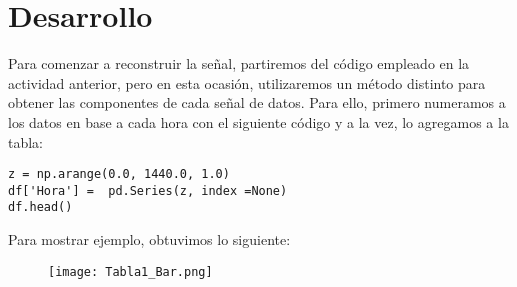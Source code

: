 \documentclass{article}
\begin{document}
\section*{\Large Desarrollo}
Para comenzar a reconstruir la señal, partiremos del código empleado en la actividad anterior, pero en esta ocasión, utilizaremos un método distinto para obtener las componentes de cada señal de datos. Para ello, primero numeramos a los datos en base a cada hora con el siguiente código y a la vez, lo agregamos a la tabla:\\
\begin{verbatim}
z = np.arange(0.0, 1440.0, 1.0)
df['Hora'] =  pd.Series(z, index =None)
df.head()
\end{verbatim}
Para mostrar ejemplo, obtuvimos lo siguiente:\\
\begin{figure}[h]
\centering
\texttt{[image: Tabla1\_Bar.png]}
\end{figure}
\end{document}
